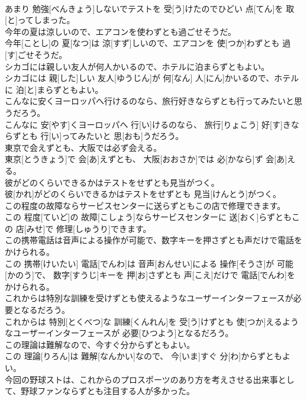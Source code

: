 \documentclass[8pt]{extreport}
\begin{document}
\begin{CJK}{UTF8}{min}
\\	あまり 勉強[べんきょう]しないでテストを 受[う]けたのでひどい 点[てん]を 取[と]ってしまった。
\\	今年の夏は涼しいので、エアコンを使わずとも過ごせそうだ。	
\\	今年[ことし]の 夏[なつ]は 涼[すず]しいので、エアコンを 使[つか]わずとも 過[す]ごせそうだ。
\\	シカゴには親しい友人が何人かいるので、ホテルに泊まらずともよい。	
\\	シカゴには 親[した]しい 友人[ゆうじん]が 何[なん] 人[にん]かいるので、ホテルに 泊[と]まらずともよい。
\\	こんなに安くヨーロッパへ行けるのなら、旅行好きならずとも行ってみたいと思うだろう。	
\\	こんなに 安[やす]くヨーロッパへ 行[い]けるのなら、 旅行[りょこう] 好[す]きならずとも 行[い]ってみたいと 思[おも]うだろう。
\\	東京で会えずとも、大阪では必ず会える。	
\\	東京[とうきょう]で 会[あ]えずとも、 大阪[おおさか]では 必[かなら]ず 会[あ]える。
\\	彼がどのくらいできるかはテストをせずとも見当がつく。	
\\	彼[かれ]がどのくらいできるかはテストをせずとも 見当[けんとう]がつく。
\\	この程度の故障ならサービスセンターに送らずともこの店で修理できます。	
\\	この 程度[ていど]の 故障[こしょう]ならサービスセンターに 送[おく]らずともこの 店[みせ]で 修理[しゅうり]できます。
\\	この携帯電話は音声による操作が可能で、数字キーを押さずとも声だけで電話をかけられる。	
\\	この 携帯[けいたい] 電話[でんわ]は 音声[おんせい]による 操作[そうさ]が 可能[かのう]で、 数字[すうじ]キーを 押[お]さずとも 声[こえ]だけで 電話[でんわ]をかけられる。
\\	これからは特別な訓練を受けずとも使えるようなユーザーインターフェースが必要となるだろう。	
\\	これからは 特別[とくべつ]な 訓練[くんれん]を 受[う]けずとも 使[つか]えるようなユーザーインターフェースが 必要[ひつよう]となるだろう。
\\	この理論は難解なので、今すぐ分からずともよい。	
\\	この 理論[りろん]は 難解[なんかい]なので、 今[いま]すぐ 分[わ]からずともよい。
\\	今回の野球ストは、これからのプロスポーツのあり方を考えさせる出来事として、野球ファンならずとも注目する人が多かった。	

\end{CJK}
\end{document}
